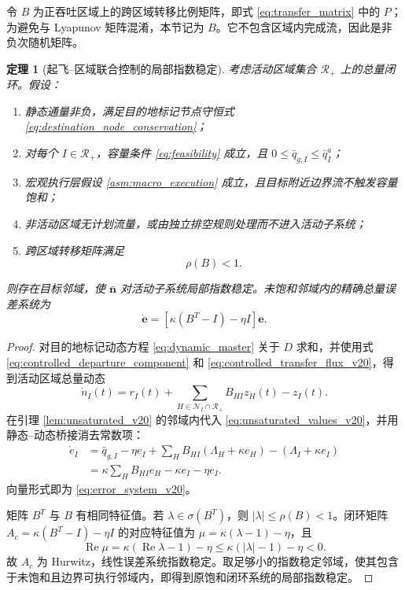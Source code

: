 \documentclass[a4paper,12pt]{article}
\theoremstyle{plain}
\newtheorem{theorem}{定理}[section]
\theoremstyle{definition}
\theoremstyle{remark}
\begin{document}
令 $B$ 为正吞吐区域上的跨区域转移比例矩阵，即式 \eqref{eq:transfer_matrix} 中的 $P$；为避免与 Lyapunov 矩阵混淆，本节记为 $B$。它不包含区域内完成流，因此是非负次随机矩阵。

\begin{theorem}[起飞--区域联合控制的局部指数稳定]\label{thm:multi_region_stability}
考虑活动区域集合 $\mathcal R_+$ 上的总量闭环。假设：
\begin{enumerate}
    \item 静态通量非负，满足目的地标记节点守恒式 \eqref{eq:destination_node_conservation}；
    \item 对每个 $I\in\mathcal R_+$，容量条件 \eqref{eq:feasibility} 成立，且 $0\le \bar q_{g,I}\le \bar q_I^a$；
    \item 宏观执行层假设 \ref{asm:macro_execution} 成立，且目标附近边界流不触发容量饱和；
    \item 非活动区域无计划流量，或由独立排空规则处理而不进入活动子系统；
    \item 跨区域转移矩阵满足
    \begin{equation}\label{eq:rho_v20}
        \rho(B)<1.
    \end{equation}
\end{enumerate}
则存在目标邻域，使 $\bar{\bm n}$ 对活动子系统局部指数稳定。未饱和邻域内的精确总量误差系统为
\begin{equation}\label{eq:error_system_v20}
    \dot{\bm e}=
    \left[\kappa(B^T-I)-\eta I\right]\bm e.
\end{equation}
\end{theorem}

\begin{proof}
对目的地标记动态方程 \eqref{eq:dynamic_master} 关于 $D$ 求和，并使用式 \eqref{eq:controlled_departure_component} 和 \eqref{eq:controlled_transfer_flux_v20}，得到活动区域总量动态
\begin{equation}
    \dot n_I(t)=r_I(t)+\sum_{H\in\mathcal N_I\cap\mathcal R_+}B_{HI}z_H(t)-z_I(t).
\end{equation}
在引理 \ref{lem:unsaturated_v20} 的邻域内代入 \eqref{eq:unsaturated_values_v20}，并用静态--动态桥接消去常数项：
\begin{align}
    \dot e_I
    &=
    \bar q_{g,I}-\eta e_I+
    \sum_H B_{HI}(\Lambda_H+\kappa e_H)
    -(\Lambda_I+\kappa e_I) \nonumber\\
    &=
    \kappa\sum_H B_{HI}e_H-\kappa e_I-\eta e_I .
\end{align}
向量形式即为 \eqref{eq:error_system_v20}。

矩阵 $B^T$ 与 $B$ 有相同特征值。若 $\lambda\in\sigma(B^T)$，则 $|\lambda|\le\rho(B)<1$。闭环矩阵 $A_c=\kappa(B^T-I)-\eta I$ 的对应特征值为 $\mu=\kappa(\lambda-1)-\eta$，且
\[
    \operatorname{Re}\mu
    =
    \kappa(\operatorname{Re}\lambda-1)-\eta
    \le
    \kappa(|\lambda|-1)-\eta<0.
\]
故 $A_c$ 为 Hurwitz，线性误差系统指数稳定。取足够小的指数稳定邻域，使其包含于未饱和且边界可执行邻域内，即得到原饱和闭环系统的局部指数稳定。
\end{proof}
\end{document}
